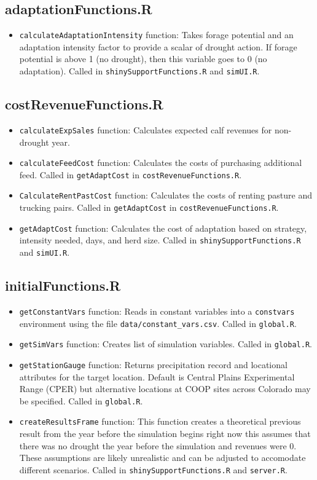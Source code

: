 \documentclass[11pt]{article}
\begin{document}
\subsection{adaptationFunctions.R}

\begin{itemize}
	\item \verb!calculateAdaptationIntensity! function: Takes forage potential and an adaptation intensity factor to provide a scalar of drought action. If forage potential is above 1 (no drought), then this variable goes to 0 (no adaptation). Called in \verb!shinySupportFunctions.R! and \verb!simUI.R!.
\end{itemize}

\subsection{costRevenueFunctions.R}

\begin{itemize}
	\item \verb!calculateExpSales! function: Calculates expected calf revenues for non-drought year. 
	\item \verb!calculateFeedCost! function: Calculates the costs of purchasing additional feed. Called in \verb!getAdaptCost! in \verb!costRevenueFunctions.R!. 
	\item \verb!CalculateRentPastCost! function: Calculates the costs of renting pasture and trucking pairs. Called in \verb!getAdaptCost! in \verb!costRevenueFunctions.R!.
	\item \verb!getAdaptCost! function: Calculates the cost of adaptation based on strategy, intensity needed, days, and herd size. Called in \verb!shinySupportFunctions.R! and \verb!simUI.R!.
\end{itemize}

\subsection{initialFunctions.R}

\begin{itemize}
	\item \verb!getConstantVars! function: Reads in constant variables into a
  \verb!constvars! environment using the  file \verb!data/constant_vars.csv!. Called in \verb!global.R!.
  	\item \verb!getSimVars! function: Creates list of simulation variables. Called in \verb!global.R!.
  	\item \verb!getStationGauge! function: Returns precipitation record and locational attributes for the target location. Default is Central Plains Experimental Range (CPER) but alternative locations at COOP sites across Colorado may be specified. Called in \verb!global.R!.
  	\item \verb!createResultsFrame! function: This function creates a theoretical previous result from the year before the simulation begins right now this assumes that there was no drought the year before the simulation and revenues were 0. These assumptions are likely unrealistic and can be adjusted to accomodate different scenarios. Called in \verb!shinySupportFunctions.R! and \verb!server.R!.
\end{itemize}
\end{document}
